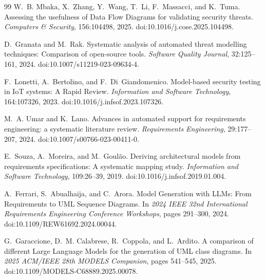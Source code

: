 \documentclass[12pt,a4paper,oneside]{report}
\begin{document}
\begin{thebibliography}{99}
W.~B. Mbaka, X.~Zhang, Y.~Wang, T.~Li, F.~Massacci, and K.~Tuma.
\newblock Assessing the usefulness of Data Flow Diagrams for validating security threats.
\newblock \emph{Computers \& Security}, 156:104498, 2025.
\newblock doi:10.1016/j.cose.2025.104498.

D.~Granata and M.~Rak.
\newblock Systematic analysis of automated threat modelling techniques: Comparison of open-source tools.
\newblock \emph{Software Quality Journal}, 32:125--161, 2024.
\newblock doi:10.1007/s11219-023-09634-4.

F.~Lonetti, A.~Bertolino, and F.~Di~Giandomenico.
\newblock Model-based security testing in IoT systems: A Rapid Review.
\newblock \emph{Information and Software Technology}, 164:107326, 2023.
\newblock doi:10.1016/j.infsof.2023.107326.

M.~A. Umar and K.~Lano.
\newblock Advances in automated support for requirements engineering: a systematic literature review.
\newblock \emph{Requirements Engineering}, 29:177--207, 2024.
\newblock doi:10.1007/s00766-023-00411-0.

E.~Souza, A.~Moreira, and M.~Goul{\~a}o.
\newblock Deriving architectural models from requirements specifications: A systematic mapping study.
\newblock \emph{Information and Software Technology}, 109:26--39, 2019.
\newblock doi:10.1016/j.infsof.2019.01.004.

A.~Ferrari, S.~Abualhaija, and C.~Arora.
\newblock Model Generation with LLMs: From Requirements to UML Sequence Diagrams.
\newblock In \emph{2024 IEEE 32nd International Requirements Engineering Conference Workshops}, pages 291--300, 2024.
\newblock doi:10.1109/REW61692.2024.00044.

G.~Garaccione, D.~M. Calabrese, R.~Coppola, and L.~Ardito.
\newblock A comparison of different Large Language Models for the generation of UML class diagrams.
\newblock In \emph{2025 ACM/IEEE 28th MODELS Companion}, pages 541--545, 2025.
\newblock doi:10.1109/MODELS-C68889.2025.00078.


\end{thebibliography}
\end{document}
